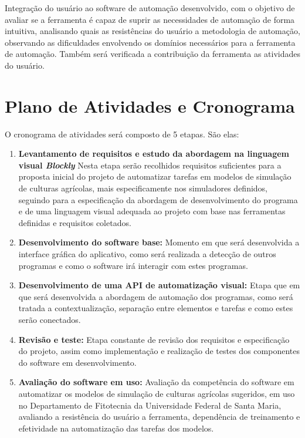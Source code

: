 \documentclass[12pt]{article}
\begin{document}
    Integração do usuário ao software de automação desenvolvido, com o objetivo de avaliar se a ferramenta é capaz de suprir as necessidades de automação de forma intuitiva, analisando quais as resistências do usuário a metodologia de automação, observando as dificuldades envolvendo os domínios necessários para a ferramenta de automação. Também será verificada a contribuição da ferramenta as atividades do usuário.

	\section{Plano de Atividades e Cronograma}

	O cronograma de atividades será composto de 5 etapas. São elas:

	\begin{enumerate}
		\item \label{activity:requisitos} \textbf{Levantamento de requisitos e estudo da abordagem na linguagem visual \emph{Blockly}}
		Nesta etapa serão recolhidos requisitos suficientes para a proposta inicial do projeto de automatizar tarefas em modelos de simulação de culturas agrícolas, mais especificamente nos simuladores definidos, seguindo para a especificação da abordagem de desenvolvimento do programa e de uma linguagem visual adequada ao projeto com base nas ferramentas definidas e requisitos coletados.
		\item \label{activity:dev1} \textbf{Desenvolvimento do software base:}
		Momento em que será desenvolvida a interface gráfica do aplicativo, como será realizada a detecção de outros programas e como o software irá interagir com estes programas.
		\item \label{activity:dev2} \textbf{Desenvolvimento de uma API de automatização visual:}
		Etapa que em que será desenvolvida a abordagem de automação dos programas, como será tratada a contextualização, separação entre elementos e tarefas e como estes serão conectados.
		\item \label{activity:revisão} \textbf{Revisão e teste:}
		Etapa constante de revisão dos requisitos e especificação do projeto, assim como implementação e realização de testes dos componentes do software em desenvolvimento.
		\item \label{activity:avaliação} \textbf{Avaliação do software em uso:}
		Avaliação da competência do software em automatizar os modelos de simulação de culturas agrícolas sugeridos, em uso no Departamento de Fitotecnia da Universidade Federal de Santa Maria, avaliando a resistência do usuário a ferramenta, dependência de treinamento e efetividade na automatização das tarefas dos modelos.
	\end{enumerate}
\end{document}

